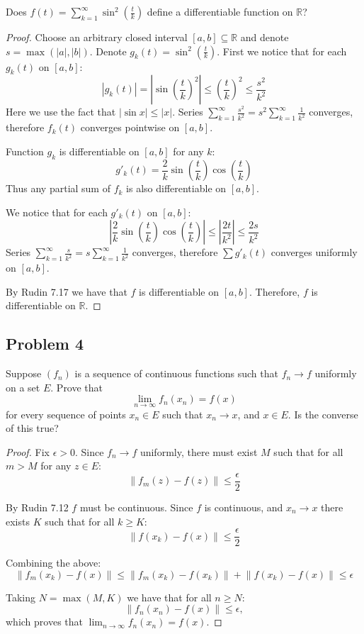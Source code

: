 \documentclass{article}
\begin{document}
\begin{tcolorbox}
Does $f(t) = \sum_{k=1}^{\infty} \sin^2 \left( \frac{t}{k} \right)$ define a differentiable function on $\mathbb{R}$?
\end{tcolorbox}
\begin{proof}
Choose an arbitrary closed interval $[a,b] \subseteq \mathbb{R}$ and denote $s = \max(|a|,|b|)$. Denote $g_k(t) = \sin^2 \left( \frac{t}{k} \right)$. First we notice that for each $g_k(t)$ on $[a,b]$:
$$ |g_k(t)| = \left| \sin \left( \frac{t}{k} \right)^2 \right| \leq \left( \frac{t}{k} \right)^2 \leq \frac{s^2}{k^2} $$
Here we use the fact that $|\sin x| \leq |x|$.
Series $\sum_{k=1}^{\infty} \frac{s^2}{k^2} = s^2 \sum_{k=1}^{\infty} \frac{1}{k^2}$ converges, therefore $f_k(t)$ converges pointwise on $[a,b]$.

Function $g_k$ is differentiable on $[a,b]$ for any $k$:
$$ g'_k(t) = \frac{2}{k} \sin \left( \frac{t}{k} \right) \cos \left( \frac{t}{k} \right) $$
Thus any partial sum of $f_k$ is also differentiable on $[a,b]$.

We notice that for each $g'_k(t)$ on $[a,b]$:
$$ \left| \frac{2}{k} \sin \left( \frac{t}{k} \right) \cos \left( \frac{t}{k} \right) \right| \leq \left| \frac{2t}{k^2} \right| \leq \frac{2s}{k^2} $$
Series $\sum_{k=1}^{\infty} \frac{s}{k^2} = s \sum_{k=1}^{\infty} \frac{1}{k^2}$ converges, therefore $\sum g'_k(t)$ converges uniformly on $[a,b]$.

By Rudin 7.17 we have that $f$ is differentiable on $[a,b]$. Therefore, $f$ is differentiable on $\mathbb{R}$.
\end{proof}


\subsection*{Problem 4}

\begin{tcolorbox}
Suppose $(f_n)$ is a sequence of continuous functions such that $f_n \to f$ uniformly on a set $E$. Prove that
$$ \lim_{n \to \infty} f_n(x_n) = f(x) $$
for every sequence of points $x_n \in E$ such that $x_n \to x$, and $x \in E$. Is the converse of this true?
\end{tcolorbox}
\begin{proof}
Fix $\epsilon>0$. Since $f_n \to f$ uniformly, there must exist $M$ such that for all $m>M$ for any $z \in E$:
$$ \lVert f_m(z) - f(z) \rVert \leq \frac{\epsilon}{2} $$

By Rudin 7.12 $f$ must be continuous. Since $f$ is continuous, and $x_n \to x$ there exists $K$ such that for all $k \geq K$:
$$ \lVert f(x_k) - f(x) \rVert \leq \frac{\epsilon}{2} $$

Combining the above:
$$ \lVert f_m(x_k) - f(x) \rVert \leq \lVert f_m(x_k) - f(x_k) \rVert + \lVert f(x_k) - f(x) \rVert \leq \epsilon $$

Taking $N = \max(M,K)$ we have that for all $n \geq N$:
$$ \lVert f_n(x_n) - f(x) \rVert \leq \epsilon, $$
which proves that $\lim_{n \to \infty} f_n(x_n) = f(x)$.
\end{proof}
\end{document}
